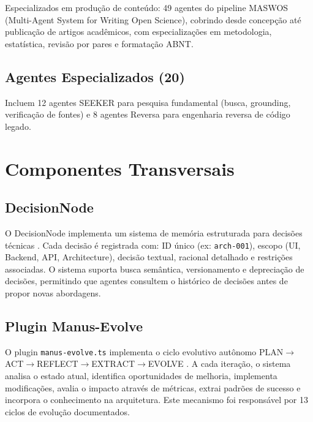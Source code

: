 \documentclass[12pt,a4paper,sumario=tradicional]{abntex2}
\begin{document}
Especializados em produção de conteúdo: 49 agentes do pipeline MASWOS (Multi-Agent System for Writing Open Science), cobrindo desde concepção até publicação de artigos acadêmicos, com especializações em metodologia, estatística, revisão por pares e formatação ABNT.

\subsection{Agentes Especializados (20)}

Incluem 12 agentes SEEKER para pesquisa fundamental (busca, grounding, verificação de fontes) e 8 agentes Reversa para engenharia reversa de código legado.

\section{Componentes Transversais}

\subsection{DecisionNode}

O DecisionNode implementa um sistema de memória estruturada para decisões técnicas \cite{kruchten2009documentation}. Cada decisão é registrada com: ID único (ex: \texttt{arch-001}), escopo (UI, Backend, API, Architecture), decisão textual, racional detalhado e restrições associadas. O sistema suporta busca semântica, versionamento e depreciação de decisões, permitindo que agentes consultem o histórico de decisões antes de propor novas abordagens.

\subsection{Plugin Manus-Evolve}

O plugin \texttt{manus-evolve.ts} implementa o ciclo evolutivo autônomo PLAN$\rightarrow$ACT$\rightarrow$REFLECT$\rightarrow$EXTRACT$\rightarrow$EVOLVE \cite{kodumagulla2026engineering}. A cada iteração, o sistema analisa o estado atual, identifica oportunidades de melhoria, implementa modificações, avalia o impacto através de métricas, extrai padrões de sucesso e incorpora o conhecimento na arquitetura. Este mecanismo foi responsável por 13 ciclos de evolução documentados.

\end{document}
